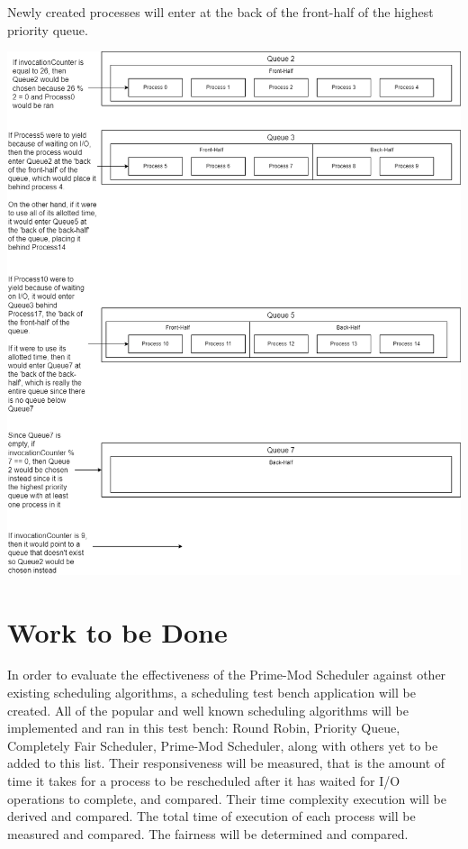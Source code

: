 \documentclass[12pt]{article}
\begin{document}
	Newly created processes will enter at the back of the front-half of the highest priority queue.
	
	\begin{center}
		\includegraphics[scale=.45]{./diagram.png}
	\end{center}
	
	\section*{Work to be Done}
	In order to evaluate the effectiveness of the Prime-Mod Scheduler against other existing scheduling algorithms, a scheduling test bench application will be created.
	All of the popular and well known scheduling algorithms will be implemented and ran in this test bench: Round Robin, Priority Queue, Completely Fair Scheduler, Prime-Mod Scheduler, along with others yet to be added to this list.
	Their responsiveness will be measured, that is the amount of time it takes for a process to be rescheduled after it has waited for I/O operations to complete, and compared.
	Their time complexity execution will be derived and compared.
	The total time of execution of each process will be measured and compared.
	The fairness will be determined and compared.\\
	
\end{document}
